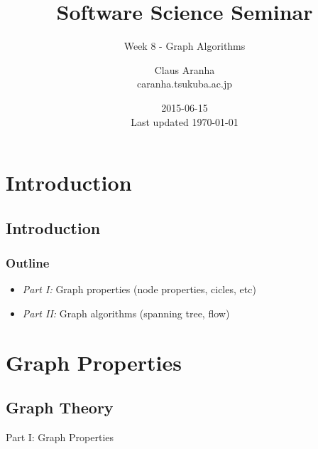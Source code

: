 \documentclass{beamer}
\title[]{Software Science Seminar}
\subtitle[]{Week 8 - Graph Algorithms}
\author[Claus Aranha]{Claus Aranha\\{\footnotesize caranha\@@cs.tsukuba.ac.jp}}
\institute{College of Information Sciences}
\date{2015-06-15\\{\tiny Last updated \today}}
\begin{document}
\section{Introduction}
\subsection{Introduction}

\begin{frame}
\maketitle
\end{frame}

\begin{frame}
  \frametitle{Outline}
  \begin{itemize}
  \item \emph{Part I:} Graph properties (node properties, cicles, etc)
  \item \emph{Part II:} Graph algorithms (spanning tree, flow)
  \end{itemize}
\end{frame}

\section{Graph Properties}
\subsection{Graph Theory}

\begin{frame}
  \begin{center}
    Part I: Graph Properties
  \end{center}
\end{frame}
\end{document}
